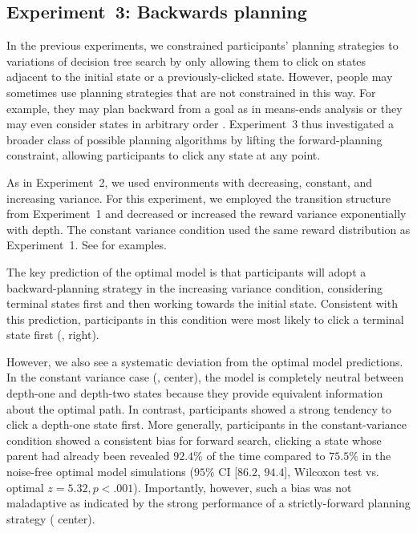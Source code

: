 \subsection{Experiment~3: Backwards planning}\label{sec:planning-results3}
In the previous experiments, we constrained participants' planning strategies to variations of decision tree search by only allowing them to click on states adjacent to the initial state or a previously-clicked state. However, people may sometimes use planning strategies that are not constrained in this way. For example, they may plan backward from a goal as in means-ends analysis \citep{newell1972human} or they may even consider states in arbitrary order \citep{sutton1990integrated}. Experiment~3 thus investigated a broader class of possible planning algorithms by lifting the forward-planning constraint, allowing participants to click any state at any point.

As in Experiment~2, we used environments with decreasing, constant, and increasing variance. For this experiment, we employed the transition structure from Experiment~1 and decreased or increased the reward variance exponentially with depth. The constant variance condition used the same reward distribution as Experiment~1. See  for examples.

The key prediction of the optimal model is that participants will adopt a backward-planning strategy in the increasing variance condition, considering terminal states first and then working towards the initial state. Consistent with this prediction, participants in this condition were most likely to click a terminal state first (, right).

However, we also see a systematic deviation from the optimal model predictions. In the constant variance case (, center), the model is completely neutral between depth-one and depth-two states because they provide equivalent information about the optimal path. In contrast, participants showed a strong tendency to click a depth-one state first. More generally, participants in the constant-variance condition showed a consistent bias for forward search, clicking a state whose parent had already been revealed $92.4\%$ of the time compared to $75.5\%$ in the noise-free optimal model simulations ($95\%$ CI [$86.2$, $94.4$], Wilcoxon test vs. optimal $z = 5.32, p < .001$). Importantly, however, such a bias was not maladaptive as indicated by the strong performance of a strictly-forward planning strategy ( center).

